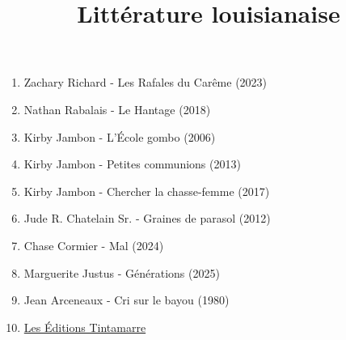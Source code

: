 \documentclass{article}
\title{Littérature louisianaise}
\date{}
\begin{document}
  \maketitle
  \begin{enumerate}
    \item Zachary Richard - Les Rafales du Carême (2023)
    \item Nathan Rabalais - Le Hantage (2018)
    \item Kirby Jambon - L'École gombo (2006)
    \item Kirby Jambon - Petites communions (2013)
    \item Kirby Jambon - Chercher la chasse-femme (2017)
    \item Jude R. Chatelain Sr. - Graines de parasol (2012)
    \item Chase Cormier - Mal (2024)
    \item Marguerite Justus - Générations (2025)
    \item Jean Arceneaux - Cri sur le bayou (1980)
    \item \href{https://www.editionstintamarre.com/catalogue}{Les Éditions Tintamarre}
  \end{enumerate}
\end{document}
